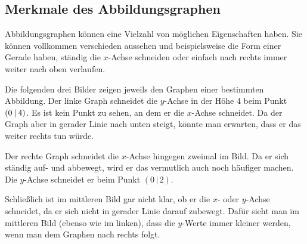 \documentclass[../../main.tex]{subfiles}
\begin{document}
\subsection{Merkmale des Abbildungsgraphen}

Abbildungsgraphen können eine Vielzahl von möglichen Eigenschaften haben. Sie können vollkommen verschieden aussehen und beispielsweise die Form einer Gerade haben, ständig die $x$-Achse schneiden oder einfach nach rechts immer weiter nach oben verlaufen.

\begin{example}
    Die folgenden drei Bilder zeigen jeweils den Graphen einer bestimmten Abbildung. Der linke Graph schneidet die $y$-Achse in der Höhe $4$ beim Punkt $\left(0 \:\middle|\: 4\right)$. Es ist kein Punkt zu sehen, an dem er die $x$-Achse schneidet. Da der Graph aber in gerader Linie nach unten steigt, könnte man erwarten, dass er das weiter rechts tun würde.
    \begin{multicols}{3}
        \centering
        
        
    \end{multicols}
    Der rechte Graph schneidet die $x$-Achse hingegen zweimal im Bild. Da er sich ständig auf- und abbewegt, wird er das vermutlich auch noch häufiger machen. Die $y$-Achse schneidet er beim Punkt $(0\,|\,2)$.
    
    Schließlich ist im mittleren Bild gar nicht klar, ob er die $x$- oder $y$-Achse schneidet, da er sich nicht in gerader Linie darauf zubewegt. Dafür sieht man im mittleren Bild (ebenso wie im linken), dass die $y$-Werte immer kleiner werden, wenn man dem Graphen nach rechts folgt.
\end{example}
\end{document}

